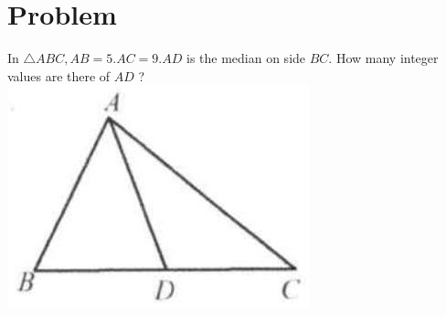 \documentclass{article}
\begin{document}
\section*{Problem}
In \(\triangle A B C, A B=5 . A C=9 . A D\) is the median on side \(B C\). How many integer values are there of \(A D\) ?\\
\centering
\includegraphics[width=\textwidth]{images/027(2).jpg}
\end{document}
